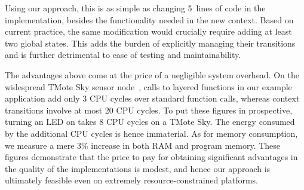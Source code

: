 Using our approach, this is as simple as changing 5~lines of code in
the \conesc implementation, besides the functionality needed in the
new  context.  Based on current practice, the same
modification would crucially require adding at least two global
states.  This adds the burden of explicitly managing their transitions
and is further detrimental to ease of testing and maintainability.

 The advantages above come at the price
of a negligible system overhead. On the widespread TMote Sky sensor
node~\cite{polastre05telos}, calls to layered functions in our example
application add only 3 CPU cycles over standard function calls,
whereas context transitions involve at most 20 CPU cycles. To put
these figures in prospective, turning an LED on takes 8 CPU cycles on
a TMote Sky. The energy consumed by the additional CPU cycles is
hence immaterial. As for memory consumption, we measure a mere 3\%
increase in both RAM and program memory. These figures demonstrate
that the price to pay for obtaining significant advantages in the
quality of the implementations is modest, and hence our
approach is ultimately feasible even on extremely resource-constrained
platforms.






